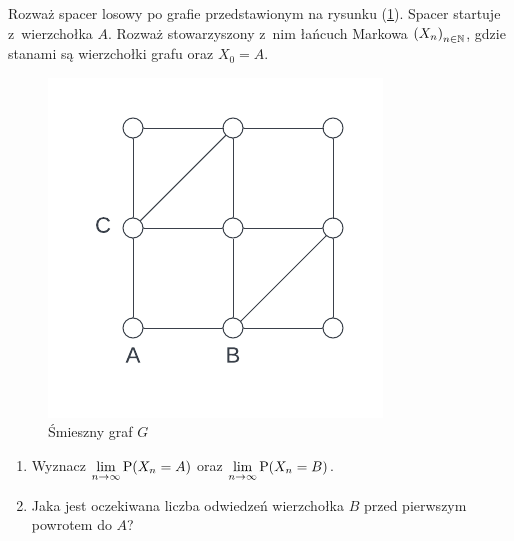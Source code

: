 \begin{exercise}
	Rozważ spacer losowy po grafie przedstawionym na rysunku (\ref{random_walks:a_b_graph}). Spacer startuje z~wierzchołka \(A\). Rozważ stowarzyszony z~nim łańcuch Markowa \(\left(X_n\right)_{n \in \mathbb{N}}\), gdzie stanami są wierzchołki grafu oraz \(X_0 = A\).
	\begin{figure}[H]
		\centering
		\includegraphics{img/markov-chains/a-b-graph.png}
		\caption{Śmieszny graf \(G\)}
		\label{random_walks:a_b_graph}
	\end{figure}
	\begin{enumerate}[label=(\roman*)]
		\item Wyznacz \(\lim\limits_{n \to \infty} \prob\pars{X_n = A}\) oraz \(\lim\limits_{n \to \infty} \prob\pars{X_n = B}\).
		\item Jaka jest oczekiwana liczba odwiedzeń wierzchołka \(B\) przed pierwszym powrotem do \(A\)?
	\end{enumerate}
\end{exercise}
